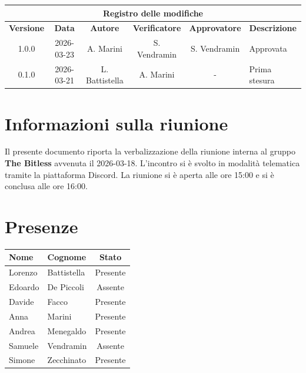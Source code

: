 \documentclass[a4paper, 10pt, colorlinks=true, linkcolor=black, urlcolor=blue, citecolor=blue, hidelinks]{article}
\begin{document}
\newcommand{\tipoverbale}{Interno}
\newcommand{\dataverbale}{2026-03-18}
\newcommand{\dataversione}{2026-03-23}
\newcommand{\versione}{1.0.0}
\newcommand{\stato}{Approvato}
\newcommand{\destinatari}{The Bitless, prof. Tullio Vardanega, prof. Riccardo Cardin}

\begin{titlepage}

\end{titlepage}

\newpage
{}

\begin{center}
    \begin{tabular}{|c|c|c|c|c|p{3.5cm}|}
        \hline
        \multicolumn{6}{|c|}{\textbf{Registro delle modifiche}} \\
        \hline
        \textbf{Versione} & \textbf{Data} & \textbf{Autore} & \textbf{Verificatore} & \textbf{Approvatore} & \textbf{Descrizione} \\
        \hline 
        1.0.0 & 2026-03-23 & A. Marini & S. Vendramin & S. Vendramin & Approvata  \\
        \hline
        0.1.0 & 2026-03-21 & L. Battistella & A. Marini & - & Prima stesura \\
        \hline
    \end{tabular}
\end{center}

\newpage
\tableofcontents 

\newpage
\section{Informazioni sulla riunione}
Il presente documento riporta la verbalizzazione della riunione interna al gruppo \textbf{The Bitless} avvenuta il \dataverbale{}. L'incontro si è svolto in modalità telematica tramite la piattaforma Discord. La riunione si è aperta alle ore 15:00 e si è conclusa alle ore 16:00.

\section{Presenze}
\begin{center}
\begin{tabular}{|l|l|c|}
\hline
\textbf{Nome} & \textbf{Cognome} & \textbf{Stato} \\
\hline
Lorenzo & Battistella & Presente \\
Edoardo & De Piccoli & Assente \\
Davide & Facco & Presente \\
Anna & Marini & Presente \\
Andrea & Menegaldo & Presente \\
Samuele & Vendramin & Assente \\
Simone & Zecchinato & Presente \\
\hline
\end{tabular}
\end{center}
\end{document}
